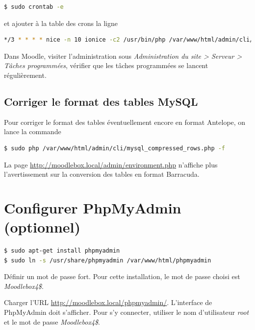 \documentclass[11pt]{article}
\begin{document}
\begin{lstlisting}[language=bash]
$ sudo crontab -e
\end{lstlisting}

et ajouter à la table des crons la ligne
\begin{lstlisting}[language=bash]
*/3 * * * * nice -n 10 ionice -c2 /usr/bin/php /var/www/html/admin/cli/cron.php
\end{lstlisting}

\begin{verification}
Dans Moodle, visiter l'administration sous \emph{Administration du site > Serveur > Tâches programmées}, vérifier que les tâches programmées se lancent régulièrement.
\end{verification}

\subsection{Corriger le format des tables MySQL}

Pour corriger le format des tables éventuellement encore en format Antelope, on lance la commande

\begin{lstlisting}[language=bash]
$ sudo php /var/www/html/admin/cli/mysql_compressed_rows.php -f
\end{lstlisting}

\begin{verification}
La page \url{http://moodlebox.local/admin/environment.php} n'affiche plus l'avertissement sur la conversion des tables en format Barracuda.
\end{verification}

\section{Configurer PhpMyAdmin (optionnel)}

\begin{lstlisting}[language=bash]
$ sudo apt-get install phpmyadmin
$ sudo ln -s /usr/share/phpmyadmin /var/www/html/phpmyadmin
\end{lstlisting}
Définir un mot de passe fort. Pour cette installation, le mot de passe choisi est \emph{Moodlebox4\$}.

\begin{verification}
Charger l'URL \url{http://moodlebox.local/phpmyadmin/}. L'interface de PhpMyAdmin doit s'afficher. Pour s'y connecter, utiliser le nom d'utilisateur \emph{root} et le mot de passe \emph{Moodlebox4\$}.
\end{verification}
\end{document}
